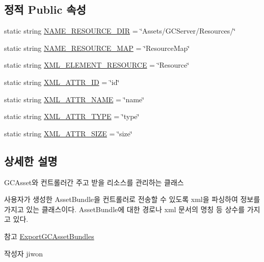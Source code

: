 \subsection*{정적 Public 속성}
\begin{DoxyCompactItemize}
\item 
static string \hyperlink{class_resource_manager_a0e3b7dbcf2f10e9261dba2597b5d05fe}{N\+A\+M\+E\+\_\+\+R\+E\+S\+O\+U\+R\+C\+E\+\_\+\+D\+I\+R} = \char`\"{}Assets/G\+C\+Server/Resources/\char`\"{}
\item 
static string \hyperlink{class_resource_manager_a1938a66b618ec099b4355e997a5f3c36}{N\+A\+M\+E\+\_\+\+R\+E\+S\+O\+U\+R\+C\+E\+\_\+\+M\+A\+P} = \char`\"{}Resource\+Map\char`\"{}
\item 
static string \hyperlink{class_resource_manager_a1ab2338caffe52ed804c94b05b26a5c1}{X\+M\+L\+\_\+\+E\+L\+E\+M\+E\+N\+T\+\_\+\+R\+E\+S\+O\+U\+R\+C\+E} = \char`\"{}Resource\char`\"{}
\item 
static string \hyperlink{class_resource_manager_a027f98709c4beea9a7fcabe8237aedfc}{X\+M\+L\+\_\+\+A\+T\+T\+R\+\_\+\+I\+D} = \char`\"{}id\char`\"{}
\item 
static string \hyperlink{class_resource_manager_a53e4547e881701612126d07eaf40183a}{X\+M\+L\+\_\+\+A\+T\+T\+R\+\_\+\+N\+A\+M\+E} = \char`\"{}name\char`\"{}
\item 
static string \hyperlink{class_resource_manager_a76e5f3f0e545a34c09fd85b33aab10b5}{X\+M\+L\+\_\+\+A\+T\+T\+R\+\_\+\+T\+Y\+P\+E} = \char`\"{}type\char`\"{}
\item 
static string \hyperlink{class_resource_manager_a4ce23d5df107fbacec3a6fe820c4dd0f}{X\+M\+L\+\_\+\+A\+T\+T\+R\+\_\+\+S\+I\+Z\+E} = \char`\"{}size\char`\"{}
\end{DoxyCompactItemize}


\subsection{상세한 설명}
G\+C\+Asset와 컨트롤러간 주고 받을 리소스를 관리하는 클래스

사용자가 생성한 Asset\+Bundle을 컨트롤러로 전송할 수 있도록 xml을 파싱하여 정보를 가지고 있는 클래스이다. Asset\+Bundle에 대한 경로나 xml 문서의 명칭 등 상수를 가지고 있다. \begin{DoxySeeAlso}{참고}
\hyperlink{class_export_g_c_asset_bundles}{Export\+G\+C\+Asset\+Bundles} 
\end{DoxySeeAlso}
\begin{DoxyAuthor}{작성자}
jiwon 
\end{DoxyAuthor}


